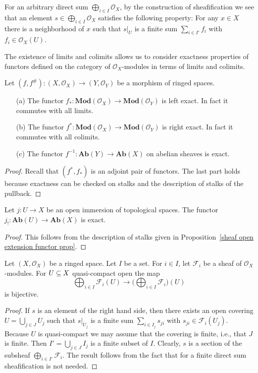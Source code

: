 \begin{remark}
For an arbitrary direct sum $\bigoplus_{i\in I}\mathscr{O}_X$, by the construction of sheafification we see that an element $s\in\bigoplus_{i\in I}\mathscr{O}_X$ satisfies the following property: For any $x\in X$ there is a neighborhood of $x$ such that $s|_U$ is a finite sum $\sum_{i\in I'}f_i$ with $f_i\in\mathscr{O}_X(U)$.
\end{remark}
The existence of limits and colimits allows us to consider exactness properties of functors defined on the category of $\mathscr{O}_X$-modules in terms of limits and colimits.
\begin{proposition}\label{ringed space morphism pullback pushforward exactness}
Let $(f,f^{\#}):(X,\mathscr{O}_X)\to(Y,\mathscr{O}_Y)$ be a morphism of ringed spaces.
\begin{itemize}
\item[(a)] The functor $f_*:\mathbf{Mod}(\mathscr{O}_X)\to\mathbf{Mod}(\mathscr{O}_Y)$ is left exact. In fact it commutes with all limits.
\item[(b)] The functor $f^*:\mathbf{Mod}(\mathscr{O}_X)\to\mathbf{Mod}(\mathscr{O}_Y)$ is right exact. In fact it commutes with all colimits.
\item[(c)] The functor $f^{-1}:\mathbf{Ab}(Y)\to\mathbf{Ab}(X)$ on abelian sheaves is exact.
\end{itemize}
\end{proposition}
\begin{proof}
Recall that $(f^*,f_*)$ is an adjoint pair of functors. The last part holds because exactness can be checked on stalks and the description of stalks of the pullback.
\end{proof}
\begin{proposition}
Let $j:U\to X$ be an open immersion of topological spaces. The functor $j_!:\mathbf{Ab}(U)\to\mathbf{Ab}(X)$ is exact.
\end{proposition}
\begin{proof}
This follows from the description of stalks given in Proposition~\ref{sheaf open extension functor prop}.
\end{proof}
\begin{proposition}\label{sheaf module quasi-compact sum}
Let $(X,\mathscr{O}_X)$ be a ringed space. Let $I$ be a set. For $i\in I$, let $\mathscr{F}_i$ be a sheaf of $\mathscr{O}_X$-modules. For $U\subseteq X$ quasi-compact open the map 
\[\bigoplus_{i\in I}\mathscr{F}_i(U)\to\Big(\bigoplus_{i\in I}\mathscr{F}_i\Big)(U)\]
is bijective.
\end{proposition}
\begin{proof}
If $s$ is an element of the right hand side, then there exists an open covering $U=\bigcup_{j\in J}U_j$ such that $s|_{U_j}$ is a finite sum $\sum_{i\in I_j}s_{ji}$ with $s_{ji}\in\mathscr{F}_i(U_j)$. Because $U$ is quasi-compact we may assume that the covering is finite, i.e., that $J$ is finite. Then $I'=\bigcup_{j\in J}I_j$ is a finite subset of $I$. Clearly, $s$ is a section of the subsheaf $\bigoplus_{i\in I'}\mathscr{F}_i$. The result follows from the fact that for a finite direct sum sheafification
is not needed.
\end{proof}
